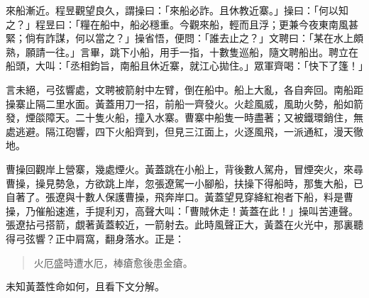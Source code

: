 來船漸近。程昱觀望良久，謂操曰：「來船必詐。且休教近寨。」操曰：「何以知之？」程昱曰：「糧在船中，船必穩重。今觀來船，輕而且浮；更兼今夜東南風甚緊；倘有詐謀，何以當之？」操省悟，便問：「誰去止之？」文聘曰：「某在水上頗熟，願請一往。」言畢，跳下小船，用手一指，十數隻巡船，隨文聘船出。聘立在船頭，大叫：「丞相鈞旨，南船且休近寨，就江心拋住。」眾軍齊喝：「快下了篷！」

言未絕，弓弦響處，文聘被箭射中左臂，倒在船中。船上大亂，各自奔回。南船距操寨止隔二里水面。黃蓋用刀一招，前船一齊發火。火趁風威，風助火勢，船如箭發，煙燄障天。二十隻火船，撞入水寨。曹寨中船隻一時盡著；又被鐵環銷住，無處逃避。隔江砲響，四下火船齊到，但見三江面上，火逐風飛，一派通紅，漫天徹地。

曹操回觀岸上營寨，幾處煙火。黃蓋跳在小船上，背後數人駕舟，冒煙突火，來尋曹操，操見勢急，方欲跳上岸，忽張遼駕一小腳船，扶操下得船時，那隻大船，已自著了。張遼與十數人保護曹操，飛奔岸口。黃蓋望見穿絳紅袍者下船，料是曹操，乃催船速進，手提利刃，高聲大叫：「曹賊休走！黃蓋在此！」操叫苦連聲。張遼拈弓搭箭，覷著黃蓋較近，一箭射去。此時風聲正大，黃蓋在火光中，那裏聽得弓弦響？正中肩窩，翻身落水。正是：

\begin{quote}
火厄盛時遭水厄，棒瘡愈後患金瘡。
\end{quote}

未知黃蓋性命如何，且看下文分解。
